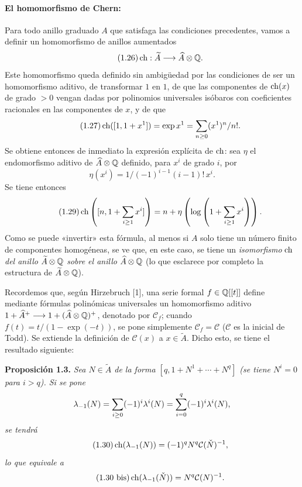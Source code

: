 \paragraph{El homomorfismo de Chern:}
Para todo anillo graduado $A$ que satisfaga las condiciones precedentes, vamos a definir un homomorfismo de anillos aumentados
\begin{equation}\tag{1.26}
\ch:\widetilde A\longrightarrow \Ahat\otimes\Q.
\end{equation}
Este homomorfismo queda definido sin ambigüedad por las condiciones de ser un homomorfismo aditivo, de transformar $1$ en $1$, de que las componentes de $\ch(x)$ de grado $>0$ vengan dadas por polinomios universales isóbaros con coeficientes racionales en las componentes de $x$, y de que
\begin{equation}\tag{1.27}
\ch([1,1+x^1])=\exp x^1=\sum_{n\geq0}(x^1)^n/n!.
\end{equation}
Se obtiene entonces de inmediato la expresión explícita de $\ch$: sea $\eta$ el endomorfismo aditivo de $\Ahat\otimes\Q$ definido, para $x^i$ de grado $i$, por
\begin{equation}\tag{1.28}
\eta(x^i)=1/(-1)^{i-1}(i-1)!\,x^i.
\end{equation}
Se tiene entonces
\begin{equation}\tag{1.29}
\ch\left([n,1+\sum_{i\geq1}x^i]\right)=n+\eta\left(\log\left(1+\sum_{i\geq1}x^i\right)\right).
\end{equation}
Como se puede «invertir» esta fórmula, al menos si $A$ solo tiene un número finito de componentes homogéneas, se ve que, en este caso, se tiene un \emph{isomorfismo} $\ch$ \emph{del anillo} $\widetilde A\otimes\Q$ \emph{sobre el anillo} $\Ahat\otimes\Q$ (lo que esclarece por completo la estructura de $\widetilde A\otimes\Q$).

Recordemos que, según Hirzebruch [1], una serie formal $f\in\Q[[t]]$ define mediante fórmulas polinómicas universales un homomorfismo aditivo $1+\Ahp\longrightarrow 1+(\Ahat\otimes\Q)^+$, denotado por $\mathcal C_f$; cuando $f(t)=t/(1-\exp(-t))$, se pone simplemente $\mathcal C_f=\mathcal C$ ($\mathcal C$ es la inicial de Todd). Se extiende la definición de $\mathcal C(x)$ a $x\in\widetilde A$. Dicho esto, se tiene el resultado siguiente:

\textbf{Proposición 1.3.} \emph{Sea $N\in\widetilde A$ de la forma $[q,1+N^1+\cdots+N^q]$ (se tiene $N^i=0$ para $i>q$). Si se pone}
\[
\lambda_{-1}(N)=\sum_{i\geq0}(-1)^i\lambda^i(N)=\sum_{i=0}^{\sisi{n}{q}}(-1)^i\lambda^i(N),
\]
\emph{se tendrá}
\begin{equation}\tag{1.30}
\ch(\lambda_{-1}(N))=(-1)^q N^q\mathcal C(\check N)^{-1},
\end{equation}
\emph{lo que equivale a}
\begin{equation}\tag{1.30 bis}
\ch(\lambda_{-1}(\check N))=N^q\mathcal C(N)^{-1}.
\end{equation}

